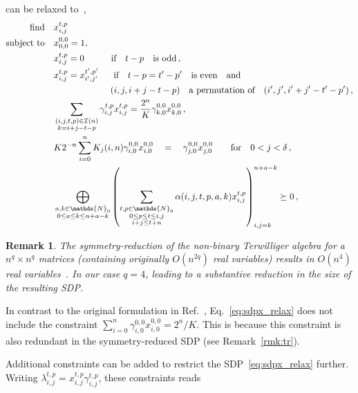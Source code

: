 \documentclass[12pt,a4paper]{amsart}
\newtheorem{remark}[theorem]{Remark}
\newcommand{\N}{\mathds{N}}
\newcommand{\II}{\mathcal{I}}
\newcommand{\nn}{\nonumber}
\begin{document}
can be relaxed to~\cite{munne2025sdpboundsquantumcodes},
% 
\begin{align}\label{eq:sdpx_relax}
	\textnormal{find} 		\quad & x^{t,p}_{i,j}  \nn \\
	\textnormal{subject to} 	\quad
	&  x^{0,0}_{0,0}=1, \nn \\
    &x^{t,p}_{i,j}=0 \quad\quad\quad \text{if}\quad  t-p \quad  \text{is odd}\,,\nn \\
	& x^{t,p}_{i,j}=x^{t',p'}_{i',j'}\,\,\,\, \quad \text{if} \quad  t-p=t'-p' \quad \text{is even} \quad \text{and} \nn \\
	&\quad\quad\quad\quad\quad\quad\,\, (i,j,i+j-t-p) \quad\text{a permutation of} \quad(i',j',i'+j'-t'-p')\,, \nn \\
	& \sum_{\substack{(i,j,t,p)\in \II(n) \\ k=i+j-t-p}}  \gamma^{t,p}_{i,j} x^{t,p}_{i,j}=\frac{2^n}{K} \gamma^{0,0}_{k,0} x^{0,0}_{k,0}   \,, \nn\\
	& K2^{-n}\sum^n_{i=0} K_j(i,n) \gamma^{0,0}_{i,0} x^{0,0}_{i,0}\quad = \quad \gamma^{0,0}_{j,0} x^{0,0}_{j,0} \quad\quad \text{for} \quad 0<j<\delta \,, \nn \\
	&\bigoplus_{\substack{a,k \in \N_0\\ 0\leq a\leq k\leq n+a-k}} \left(\sum\limits_{\substack{t,p\in \N_0 \\ 0 \leq p \leq t \leq i,j \\ i+j\leq t+n}}\alpha(i,j,t,p,a,k)x_{i,j}^{t,p}\right)_{i,j=k}^{n+a-k}   \succeq 0\,,
\end{align}

\begin{remark}  \label{rem:scaling}  
The symmetry-reduction of the non-binary Terwilliger algebra for a $n^q\times n^q$ matrices 
(containing originally 
$O(n^{2q})$ real variables)
results in 
$O(n^4)$ real variables~\cite{GIJSWIJT20061719}.
In our case $q=4$, leading to a substantive reduction in the size of the resulting SDP.
\end{remark}

% 
In contrast to the original formulation in Ref.~\cite[Theorem 22]{munne2025sdpboundsquantumcodes}, Eq.~\eqref{eq:sdpx_relax} does not include the constraint $\sum^n_{i=0}\gamma^{0,0}_{i,0}x^{0,0}_{i,0}=2^n/K$.
% 
This is because this constraint is also redundant in the symmetry-reduced SDP (see Remark~\ref{rmk:tr}). 


Additional constraints can be added to restrict the SDP~\eqref{eq:sdpx_relax} further. 
Writing $\lambda^{t,p}_{i,j}= x^{t,p}_{i,j}\gamma^{t,p}_{i,j}$, these constraints reads
\end{document}
